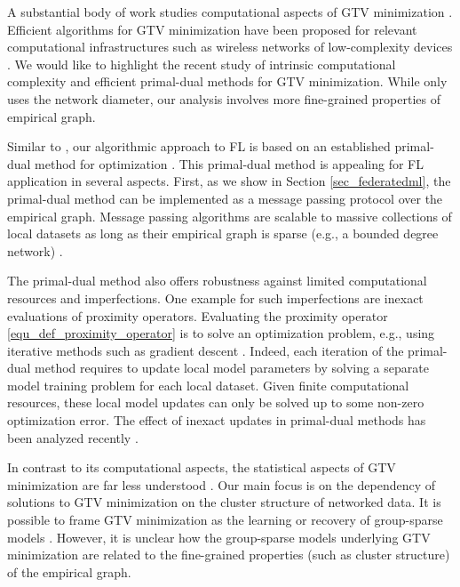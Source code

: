 \documentclass[lettersize,journal]{IEEEtran}
\begin{document}
A substantial body of work studies computational aspects of GTV minimization \cite{NIPS2008_fccb3cdc}. 
Efficient algorithms for GTV minimization have been proposed for relevant computational infrastructures 
such as wireless networks of low-complexity devices \cite{DistrOptStatistLearningADMM,NedicTransAC2009}. We would like to highlight the recent study \cite{NEURIPS2018_8fb21ee7} 
of intrinsic computational complexity and efficient primal-dual methods for GTV minimization. While 
\cite{NEURIPS2018_8fb21ee7} only uses the network diameter, our analysis involves more fine-grained properties of empirical graph. 

Similar to \cite{NEURIPS2018_8fb21ee7}, our algorithmic approach to FL is based on an established primal-dual 
method for optimization \cite{pock_chambolle_2016}. This primal-dual method is 
appealing for FL application in several aspects. First, as we show in Section \ref{sec_federatedml}, the primal-dual 
method \cite[Alg. 6]{pock_chambolle_2016} can be implemented as a message passing protocol over the empirical graph. 
Message passing algorithms are scalable to massive collections of local datasets as long as their empirical graph 
is sparse (e.g., a bounded degree network) \cite{Yedidia:2011aa}. 

The primal-dual method\cite[Alg. 6]{pock_chambolle_2016} also offers robustness against limited computational 
resources and imperfections. One example for such imperfections are inexact evaluations of proximity 
operators. Evaluating the proximity operator \eqref{equ_def_proximity_operator} is to solve an optimization 
problem, e.g., using iterative methods such as gradient descent  \cite{Condat2013,ChambolleStochPDHG2018}.
Indeed, each iteration of the primal-dual method requires to update local model parameters by 
solving a separate model training problem for each local dataset. Given finite computational resources, 
these local model updates can only be solved up to some non-zero optimization error. 
The effect of inexact updates in primal-dual methods has been analyzed recently \cite{Rasch:2020tx}. 

In contrast to its computational aspects, the statistical aspects of GTV minimization are far less 
understood \cite{NetworkLasso,Smith2017}. Our main focus is on the dependency of solutions to 
GTV minimization on the cluster structure of networked data. It is possible to frame GTV 
minimization as the learning or recovery of group-sparse models \cite{BuhlGeerBook}. 
However, it is unclear how the group-sparse models underlying GTV minimization are related to the 
fine-grained properties (such as cluster structure) of the empirical graph.  
\end{document}
